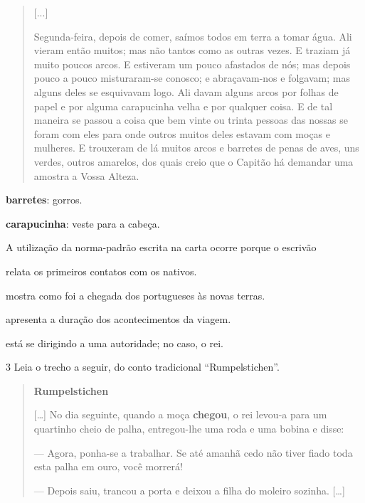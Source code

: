 \begin{quote}
{[}...{]}

Segunda-feira, depois de comer, saímos todos em terra a tomar água. Ali
vieram então muitos; mas não tantos como as outras vezes. E traziam já
muito poucos arcos. E estiveram um pouco afastados de nós; mas depois
pouco a pouco misturaram-se conosco; e abraçavam-nos e folgavam; mas
alguns deles se esquivavam logo. Ali davam alguns arcos por folhas de
papel e por alguma carapucinha velha e por qualquer coisa. E de tal
maneira se passou a coisa que bem vinte ou trinta pessoas das nossas se
foram com eles para onde outros muitos deles estavam com moças e
mulheres. E trouxeram de lá muitos arcos e barretes de penas de aves,
uns verdes, outros amarelos, dos quais creio que o Capitão há demandar
uma amostra a Vossa Alteza.


\end{quote}

\textbf{barretes}: gorros.

\textbf{carapucinha}: veste para a cabeça.

A utilização da norma-padrão escrita na carta ocorre porque o escrivão

\begin{escolha}
\item relata os primeiros contatos com os nativos.

\item mostra como foi a chegada dos portugueses às novas terras.

\item apresenta a duração dos acontecimentos da viagem.

\item está se dirigindo a uma autoridade; no caso, o rei.
\end{escolha}

\num{3} Leia o trecho a seguir, do conto tradicional ``Rumpelstichen''.

\begin{quote}
\textbf{Rumpelstichen}

{[}\ldots{}{]} No dia seguinte, quando a moça \textbf{chegou}, o rei
levou-a para um quartinho cheio de palha, entregou-lhe uma roda e uma
bobina e disse:

--- Agora, ponha-se a trabalhar. Se até amanhã cedo não tiver fiado toda
esta palha em ouro, você morrerá!

--- Depois saiu, trancou a porta e deixou a filha do moleiro sozinha.
{[}\ldots{}{]}

\end{quote}

